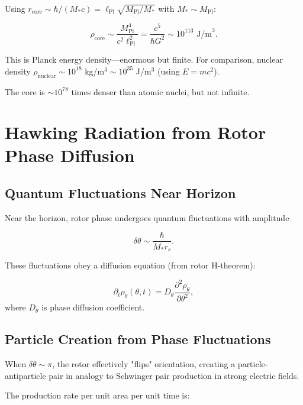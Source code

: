 \documentclass[11pt,a4paper]{article}
\numberwithin{equation}{section}
\theoremstyle{plain}
\theoremstyle{definition}
\theoremstyle{remark}
\begin{document}
Using $r_{\text{core}} \sim \hbar/(M_* c) = \ell_{\text{Pl}}\sqrt{M_{\text{Pl}}/M_*}$ with $M_* \sim M_{\text{Pl}}$:

\begin{equation}
\rho_{\text{core}} \sim \frac{M_{\text{Pl}}^4}{c^2 \ell_{\text{Pl}}^2} = \frac{c^5}{\hbar G^2} \sim 10^{113} \text{ J/m}^3.
\end{equation}

This is Planck energy density—enormous but finite. For comparison, nuclear density $\rho_{\text{nuclear}} \sim 10^{18}$ kg/m$^3 \sim 10^{35}$ J/m$^3$ (using $E = mc^2$).

The core is $\sim 10^{78}$ times denser than atomic nuclei, but not infinite.

\section{Hawking Radiation from Rotor Phase Diffusion}
\label{sec:hawking}

\subsection{Quantum Fluctuations Near Horizon}

Near the horizon, rotor phase undergoes quantum fluctuations with amplitude

\begin{equation}
\delta\theta \sim \frac{\hbar}{M_* r_s}.
\end{equation}

These fluctuations obey a diffusion equation (from rotor H-theorem):

\begin{equation}
\partial_t \rho_\theta(\theta, t) = D_\theta \frac{\partial^2 \rho_\theta}{\partial\theta^2},
\label{eq:phase-diffusion}
\end{equation}
where $D_\theta$ is phase diffusion coefficient.

\subsection{Particle Creation from Phase Fluctuations}

When $\delta\theta \sim \pi$, the rotor effectively "flips" orientation, creating a particle-antiparticle pair in analogy to Schwinger pair production in strong electric fields.

The production rate per unit area per unit time is:
\end{document}
